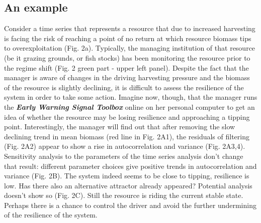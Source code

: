 \documentclass[12pt,a4paper,final]{article}
\begin{document}
\subsection{An example}
Consider a time series that represents a resource that due to increased harvesting is facing the risk of reaching a point of no return at which resource biomass tips to overexploitation (Fig. 2a). Typically, the managing institution of that resource (be it grazing grounds, or fish stocks) has been monitoring the resource prior to the regime shift (Fig. 2 green part - upper left panel). Despite the fact that the manager is aware of changes in the driving harvesting pressure and the biomass of the resource is slightly declining, it is difficult to assess the resilience of the system in order to take some action. Imagine now, though, that the manager runs the \textbf{\textit{Early Warning Signal Toolbox}} online on her personal computer to get an idea of whether the resource may be losing resilience and approaching a tipping point. Interestingly, the manager will find out that after removing the slow declining trend in mean biomass (red line in Fig. 2A1), the residuals of filtering (Fig. 2A2) appear to show a rise in autocorrelation and variance (Fig. 2A3,4). Sensitivity analysis to the parameters of the time series analysis don't change that result: different parameter choices give positive trends in autocorrelation and variance (Fig. 2B). The system indeed seems to be close to tipping, resilience is low. Has there also an alternative attractor already appeared? Potential analysis doesn't show so (Fig. 2C). Still the resource is riding the current stable state. Perhaps there is a chance to control the driver and avoid the further undermining of the resilience of the system. 

\end{document}
